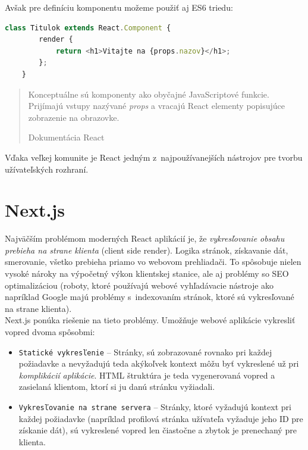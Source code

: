 \medskip

\noindent Avšak pre definíciu komponentu možeme použiť aj ES6 triedu: \\

\begin{lstlisting}[language=TypeScript, caption=Príklad definície triedneho komponentu.]
	class Titulok extends React.Component {
		render {
			return <h1>Vitajte na {props.nazov}</h1>;
		};
	}
\end{lstlisting}

\medskip

\blockquote[Dokumentácia React \cite{React}]{Konceptuálne sú komponenty ako obyčajné JavaScriptové funkcie. Prijímajú vstupy nazývané \emph{props} a vracajú React elementy popisujúce zobrazenie na obrazovke.}

\noindent Vďaka veľkej komunite je React jedným z~najpoužívanejších nástrojov pre tvorbu užívateľských rozhraní. 

\section{Next.js}
\label{theory:nextjs}
Najväčším problémom moderných React aplikácií je, že \emph{vykresľovanie obsahu prebieha na strane klienta} (client side render). Logika stránok, získavanie dát, smerovanie, všetko prebieha priamo vo webovom prehliadači. To spôsobuje nielen vysoké nároky na výpočetný výkon klientskej stanice, ale aj problémy so SEO optimalizáciou (roboty, ktoré používajú webové vyhľadávacie nástroje ako napríklad Google majú problémy s~indexovaním stránok, ktoré sú vykresľované na strane klienta). \\

\noindent Next.js ponúka riešenie na tieto problémy. Umožňuje webové aplikácie vykresliť vopred dvoma spôsobmi:

\begin{itemize}
	\item \texttt{Statické vykresľenie} -- Stránky, sú zobrazované rovnako pri každej požiadavke a nevyžadujú teda akýkoľvek kontext môžu byť vykreslené už pri \emph{komplikácií aplikácie}. HTML štruktúra je teda vygenerovaná vopred a zasielaná klientom, ktorí si ju danú stránku vyžiadali.
	\item \texttt{Vykresľovanie na strane servera} -- Stránky, ktoré vyžadujú kontext pri každej požiadavke (napríklad profilová stránka užívateľa vyžaduje jeho ID pre získanie dát), sú vykreslené vopred len čiastočne a zbytok je prenechaný pre klienta.
\end{itemize}

